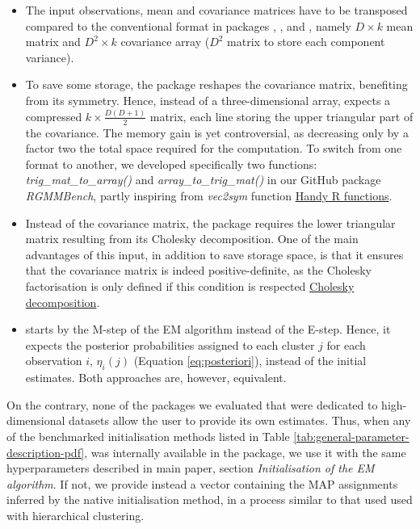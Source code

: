 \begin{itemize}
\item
  The input observations, mean and covariance matrices have to be transposed compared to the conventional format in packages , ,  and , namely \(D \times k\) mean matrix and \(D^2 \times k\) covariance array (\(D^2\) matrix to store each component variance).
\item
  To save some storage, the  package reshapes the covariance matrix, benefiting from its symmetry. Hence, instead of a three-dimensional array,  expects a compressed \(k \times \frac{D(D+1)}{2}\) matrix, each line storing the upper triangular part of the covariance. The memory gain is yet controversial, as decreasing only by a factor two the total space required for the computation. To switch from one format to another, we developed specifically two functions: \emph{trig\_mat\_to\_array()} and \emph{array\_to\_trig\_mat()} in our GitHub package \emph{RGMMBench}, partly inspiring from \emph{vec2sym} function \href{https://rdrr.io/github/patr1ckm/patr1ckm/man/vec2sym.html}{Handy R functions}.
\item
  Instead of the covariance matrix, the  package requires the lower triangular matrix resulting from its Cholesky decomposition. One of the main advantages of this input, in addition to save storage space, is that it ensures that the covariance matrix is indeed positive-definite, as the Cholesky factorisation is only defined if this condition is respected \href{https://en.wikipedia.org/wiki/Cholesky_decomposition}{Cholesky decomposition}.
\item
   starts by the M-step of the EM algorithm instead of the E-step. Hence, it expects the posterior probabilities assigned to each cluster \(j\) for each observation \(i\), \(\eta_i(j)\) (Equation \eqref{eq:posteriori}), instead of the initial estimates. Both approaches are, however, equivalent.
\end{itemize}

On the contrary, none of the packages we evaluated that were dedicated to high-dimensional datasets allow the user to provide its own estimates. Thus, when any of the benchmarked initialisation methods listed in Table \ref{tab:general-parameter-description-pdf}, was internally available in the package, we use it with the same hyperparameters described in main paper, section \emph{Initialisation of the EM algorithm}. If not, we provide instead a vector containing the MAP assignments inferred by the native initialisation method, in a process similar to that used used with hierarchical clustering.

